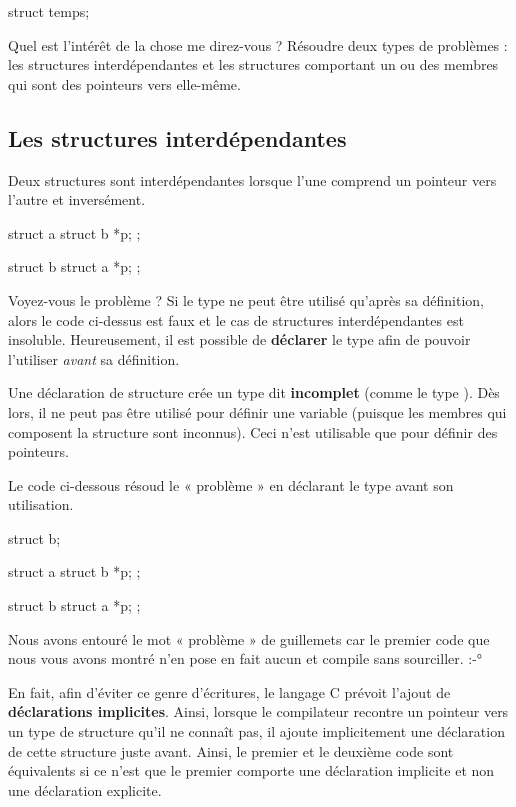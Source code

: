 \begin{C}
struct temps;
\end{C}

Quel est l'intérêt de la chose me direz-vous ? Résoudre deux types de
problèmes : les structures interdépendantes et les structures comportant
un ou des membres qui sont des pointeurs vers elle-même.

\subsection{Les structures interdépendantes}
\label{les-structures-interdependantes}

Deux structures sont interdépendantes lorsque l'une comprend un pointeur
vers l'autre et inversément.

\begin{C}
struct a {
    struct b *p;
};

struct b {
    struct a *p;
};
\end{C}

Voyez-vous le problème ? Si le type  ne peut être
utilisé qu'après sa définition, alors le code ci-dessus est faux et le
cas de structures interdépendantes est insoluble. Heureusement, il est
possible de \textbf{déclarer} le type  afin de pouvoir
l'utiliser \emph{avant} sa définition.

\begin{erreurbox}
Une déclaration de structure crée un type dit \textbf{incomplet}
(comme le type ). Dès lors, il ne peut pas être 
utilisé pour définir une variable (puisque les membres qui composent
la structure sont inconnus). Ceci n'est utilisable que pour
définir des pointeurs.
\end{erreurbox}


Le code ci-dessous résoud le « problème » en déclarant le type
 avant son utilisation.

\begin{C}
struct b;

struct a {
    struct b *p;
};

struct b {
    struct a *p;
};
\end{C}

Nous avons entouré le mot « problème » de guillemets car le premier code
que nous vous avons montré n'en pose en fait aucun et compile sans
sourciller. :-°

En fait, afin d'éviter ce genre d'écritures, le langage C prévoit
l'ajout de \textbf{déclarations implicites}. Ainsi, lorsque le
compilateur recontre un pointeur vers un type de structure qu'il ne
connaît pas, il ajoute implicitement une déclaration de cette structure
juste avant. Ainsi, le premier et le deuxième code sont équivalents si
ce n'est que le premier comporte une déclaration implicite et non une
déclaration explicite.

